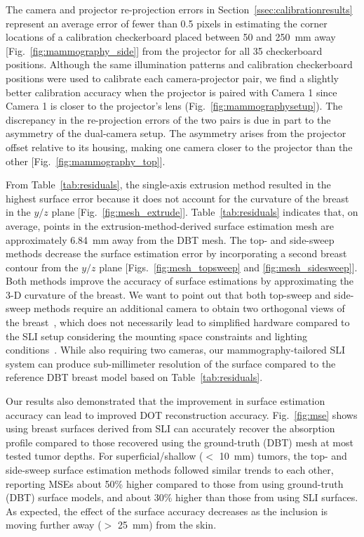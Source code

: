 The camera and projector re-projection errors in Section~\ref{ssec:calibrationresults} represent an average error of fewer than 0.5 pixels in estimating the corner locations of a calibration checkerboard placed between 50 and 250~mm away [Fig.~\ref{fig:mammography_side}] from the projector for all 35 checkerboard positions. Although the same illumination patterns and calibration checkerboard positions were used to calibrate each camera-projector pair, we find a slightly better calibration accuracy when the projector is paired with Camera 1 since Camera 1 is closer to the projector's lens (Fig.~\ref{fig:mammographysetup}). The discrepancy in the re-projection errors of the two pairs is due in part to the asymmetry of the dual-camera setup. The asymmetry arises from the projector offset relative to its housing, making one camera closer to the projector than the other [Fig.~\ref{fig:mammography_top}]. 

From Table~\ref{tab:residuals}, the single-axis extrusion method resulted in the highest surface error because it does not account for the curvature of the breast in the $y/z$ plane [Fig.~\ref{fig:mesh_extrude}]. Table~\ref{tab:residuals} indicates that, on average, points in the extrusion-method-derived surface estimation mesh are approximately 6.84~mm away from the \ac{DBT} mesh. The top- and side-sweep methods decrease the surface estimation error by incorporating a second breast contour from the $y/z$ plane [Figs.~\ref{fig:mesh_topsweep} and \ref{fig:mesh_sidesweep}]. Both methods improve the accuracy of surface estimations by approximating the 3-D curvature of the breast. We want to point out that both top-sweep and side-sweep methods require an additional camera to obtain two orthogonal views of the breast~\cite{Pinto2020}, which does not necessarily lead to simplified hardware compared to the \ac{SLI} setup considering the mounting space constraints and lighting conditions~\cite{Rodriguez2017}. While also requiring two cameras, our mammography-tailored \ac{SLI} system can produce sub-millimeter resolution of the surface compared to the reference \ac{DBT} breast model based on Table~\ref{tab:residuals}.

Our results also demonstrated that the improvement in surface estimation accuracy can lead to improved \ac{DOT} reconstruction accuracy. Fig.~\ref{fig:mse} shows using breast surfaces derived from \ac{SLI} can accurately recover the absorption profile compared to those recovered using the ground-truth (\ac{DBT}) mesh at most tested tumor depths. For superficial/shallow ($<$ 10~mm) tumors, the top- and side-sweep surface estimation methods followed similar trends to each other, reporting \ac{MSE}s about 50\% higher compared to those from using ground-truth (\ac{DBT}) surface models, and about 30\% higher than those from using \ac{SLI} surfaces. As expected, the effect of the surface accuracy decreases as the inclusion is moving further away ($>$ 25~mm) from the skin.

